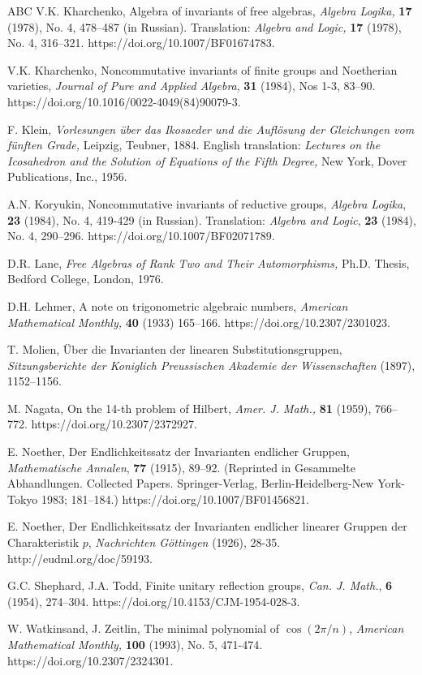 \documentclass{amsart}[12pt]
\theoremstyle{definition}
\begin{document}
\begin{thebibliography}{ABC}
V.K. Kharchenko,
Algebra of invariants of free algebras,
{\em Algebra Logika,} {\bf 17} (1978), No. 4, 478--487 (in Russian).
Translation: {\em Algebra and Logic,} {\bf 17} (1978), No. 4, 316--321.
https://doi.org/10.1007/BF01674783.

V.K. Kharchenko,
Noncommutative invariants of finite groups and Noetherian varieties,
{\em Journal of Pure and Applied Algebra}, {\bf 31} (1984), Nos 1-3, 83--90.
https://doi.org/10.1016/0022-4049(84)90079-3.

F. Klein,
{\em Vorlesungen {\"u}ber das Ikosaeder und die Aufl{\"o}sung der Gleichungen vom f{\"u}nften Grade,}
Leipzig, Teubner, 1884. English translation: {\em Lectures on the Icosahedron and the Solution of Equations of the Fifth Degree,}
New York, Dover Publications, Inc., 1956.

A.N. Koryukin,
Noncommutative invariants of reductive groups, {\em Algebra Logika}, {\bf 23} (1984), No. 4, 419-429 (in Russian).
Translation: {\em Algebra and Logic}, {\bf 23} (1984), No. 4, 290--296.
https://doi.org/10.1007/BF02071789.

D.R. Lane,
{\em Free Algebras of Rank Two and Their Automorphisms,}
Ph.D. Thesis, Bedford College, London, 1976.

D.H. Lehmer,
A note on trigonometric algebraic numbers, {\em American Mathematical Monthly,} {\bf 40} (1933) 165--166.
https://doi.org/10.2307/2301023.
	
T. Molien,
\"{U}ber die Invarianten der linearen Substitutionsgruppen,
{\em Sitzungsberichte der Koniglich Preussischen Akademie der Wissenschaften} (1897),  1152--1156.

M. Nagata,
On the 14-th problem of Hilbert,
{\em Amer. J. Math.,} {\bf 81} (1959), 766--772.
https://doi.org/10.2307/2372927.


E. Noether,
Der Endlichkeitssatz der Invarianten endlicher Gruppen,
{\em Mathematische Annalen}, {\bf 77} (1915), 89--92.
(Reprinted in Gesammelte Abhandlungen. Collected Papers. Springer-Verlag, Berlin-Heidelberg-New York-Tokyo 1983; 181--184.)
https://doi.org/10.1007/BF01456821.

E. Noether,
Der Endlichkeitssatz der Invarianten endlicher linearer Gruppen der Charakteristik $p$,
{\em Nachrichten G\"ottingen} (1926), 28-35.
http://eudml.org/doc/59193.

G.C. Shephard, J.A. Todd,
Finite unitary reflection groups,
{\em  Can. J. Math.}, {\bf 6} (1954), 274--304.
https://doi.org/10.4153/CJM-1954-028-3.		

W. Watkinsand, J. Zeitlin,
The minimal polynomial of $\cos (2\pi/n)$,
{\em American Mathematical Monthly,} {\bf 100} (1993), No. 5, 471-474.
https://doi.org/10.2307/2324301.

\end{thebibliography}
\end{document}
